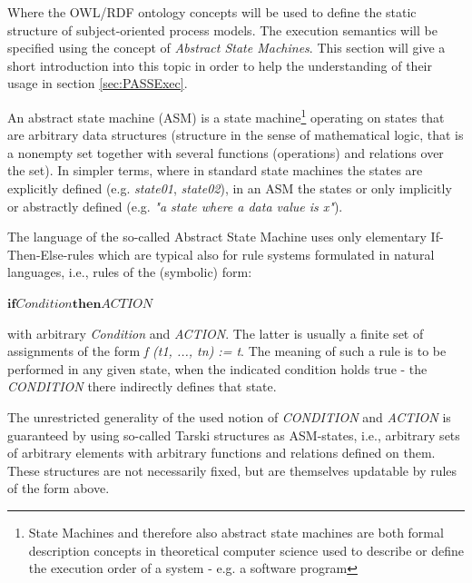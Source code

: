 Where the OWL/RDF ontology concepts will be used to define the static structure of subject-oriented process models. The execution semantics will be specified using the concept of \textit{Abstract State Machines}. This section will give a short introduction into this topic in order to help the understanding of their usage in section \ref{sec:PASSExec}.

An abstract state machine (ASM) is a state machine\footnote{State Machines and therefore also abstract state machines are both formal description concepts in theoretical computer science used to describe or define the execution order of a system - e.g. a software program} operating on states that are arbitrary data structures (structure in the sense of mathematical logic, that is a nonempty set together with several functions (operations) and relations over the set). In simpler terms, where in standard state machines the states are explicitly defined (e.g. \textit{state01}, \textit{state02}), in an ASM the states or only implicitly or abstractly defined (e.g. \textit{"a state where a data value is x"}).

The language of the so-called Abstract State Machine uses only elementary If-Then-Else-rules which are typical also for rule systems formulated in natural languages, i.e., rules of the (symbolic) form:

\medskip
$\boldsymbol{if} \textit{Condition} \boldsymbol{then} \textit{ACTION}$
\medskip

with arbitrary \textit{Condition} and \textit{ACTION}. The latter is usually a finite set of assignments of the form \textit{f (t1, ..., tn) := t}. The meaning of such a rule is to be performed in any given state, when the indicated condition holds true - the \textit{CONDITION} there indirectly defines that state.

The unrestricted generality of the used notion of \textit{CONDITION} and \textit{ACTION} is guaranteed by using so-called Tarski structures as ASM-states, i.e., arbitrary sets of arbitrary elements with arbitrary functions and relations defined on them. These structures are not necessarily fixed, but are themselves updatable by rules of the form above. 


